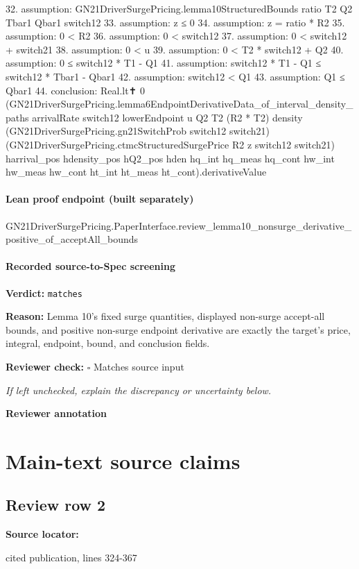 \documentclass[10pt]{article}
\newcommand{\reviewerbox}{%
  \par\noindent\fbox{\parbox{0.96\linewidth}{\rule{0pt}{0.38in}}}\par
}
\newcommand{\reviewmatch}[1]{%
  \par\noindent\textbf{Reviewer check:} $\square$\; #1\par
  \noindent\emph{If left unchecked, explain the discrepancy or uncertainty below.}\par
}
\begin{document}
\begin{ReviewVerbatim}
32. assumption: GN21DriverSurgePricing.lemma10StructuredBounds ratio T2 Q2 Tbar1 Qbar1 switch12
33. assumption: z ≤ 0
34. assumption: z = ratio * R2
35. assumption: 0 < R2
36. assumption: 0 < switch12
37. assumption: 0 < switch12 + switch21
38. assumption: 0 < u
39. assumption: 0 < T2 * switch12 + Q2
40. assumption: 0 ≤ switch12 * T1 - Q1
41. assumption: switch12 * T1 - Q1 ≤ switch12 * Tbar1 - Qbar1
42. assumption: switch12 < Q1
43. assumption: Q1 ≤ Qbar1
44. conclusion: Real.lt✝ 0
  (GN21DriverSurgePricing.lemma6EndpointDerivativeData_of_interval_density_paths arrivalRate switch12 lowerEndpoint u Q2
      T2 (R2 * T2) density (GN21DriverSurgePricing.gn21SwitchProb switch12 switch21)
      (GN21DriverSurgePricing.ctmcStructuredSurgePrice R2 z switch12 switch21) harrival_pos hdensity_pos hQ2_pos hden
      hq_int hq_meas hq_cont hw_int hw_meas hw_cont ht_int ht_meas ht_cont).derivativeValue
\end{ReviewVerbatim}

\paragraph{Lean proof endpoint (built separately)}\begin{ReviewVerbatim}
GN21DriverSurgePricing.PaperInterface.review_lemma10_nonsurge_derivative_positive_of_acceptAll_bounds
\end{ReviewVerbatim}

\paragraph{Recorded source-to-Spec screening}
\textbf{Verdict:} \texttt{matches}
\\
{\raggedright
\textbf{Reason:} Lemma 10's fixed surge quantities, displayed non-\allowbreak{}surge accept-\allowbreak{}all bounds, and positive non-\allowbreak{}surge endpoint derivative are exactly the target's price, integral, endpoint, bound, and conclusion fields.\allowbreak{}
\par}
\reviewmatch{Matches source input}
\noindent\textbf{Reviewer annotation}\par
\reviewerbox
\clearpage
\hypertarget{source-claim-0847fd2171fe1fa6}{}
\hypertarget{source-section-0c7af8265958a9ea}{}
\section*{Main-text source claims}
\subsection*{Review row 2}
\textbf{Source locator:} {\footnotesize\raggedright cited publication, lines 324-\allowbreak{}367\par}
\end{document}

